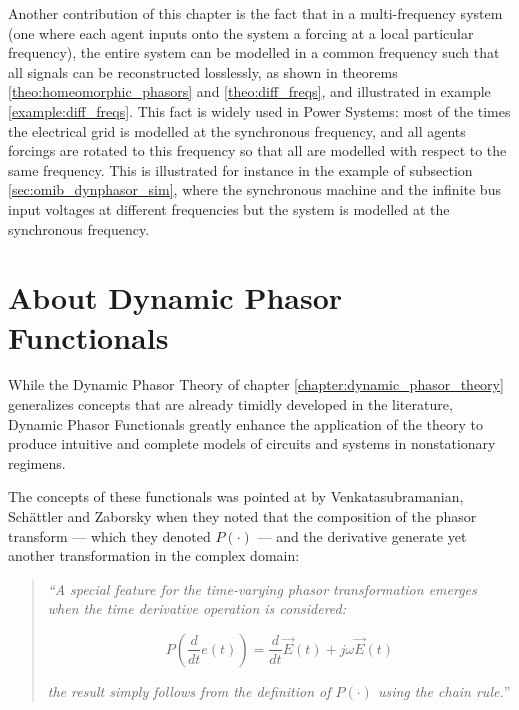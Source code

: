 	Another contribution of this chapter is the fact that in a multi-frequency system (one where each agent inputs onto the system a forcing at a local particular frequency), the entire system can be modelled in a common frequency such that all signals can be reconstructed losslessly, as shown in theorems \ref{theo:homeomorphic_phasors} and \ref{theo:diff_freqs}, and illustrated in example \ref{example:diff_freqs}. This fact is widely used in Power Systems: most of the times the electrical grid is modelled at the synchronous frequency, and all agents forcings are rotated to this frequency so that all are modelled with respect to the same frequency. This is illustrated for instance in the example of subsection \ref{sec:omib_dynphasor_sim}, where the synchronous machine and the infinite bus input voltages at different frequencies but the system is modelled at the synchronous frequency.

\section{About Dynamic Phasor Functionals}%

	While the Dynamic Phasor Theory of chapter \ref{chapter:dynamic_phasor_theory} generalizes concepts that are already timidly developed in the literature, Dynamic Phasor Functionals greatly enhance the application of the theory to produce intuitive and complete models of circuits and systems in nonstationary regimens.

	The concepts of these functionals was pointed at by Venkatasubramanian, Schättler and Zaborsky when they noted that the composition of the phasor transform — which they denoted $P(\cdot)$ — and the derivative generate yet another transformation in the complex domain:

\begin{quotation}
	\textit{``A special feature for the time-varying phasor transformation emerges when the time derivative operation is considered:}

\begin{equation} P\left(\dfrac{d}{dt}e(t)\right) = \dfrac{d}{dt}\vec{E}(t) + j\omega \vec{E}(t) \label{eq:venka_p_operator}\end{equation}

	\noindent\textit{the result simply follows from the definition of $P(\cdot)$ using the chain rule.}''\hfill{}
\end{quotation}

